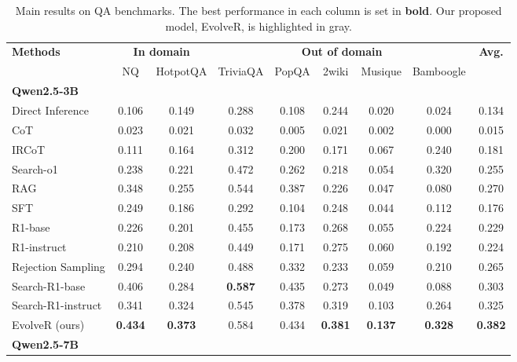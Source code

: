 \begin{table}[!t]
    \small
    \centering
    \setlength{\tabcolsep}{5pt}
    \caption{Main results on QA benchmarks. The best performance in each column is set in \textbf{bold}. Our proposed model, EvolveR, is highlighted in gray.}
    \label{tab:main_results}
    \begin{tabular}{l cc ccccc c} %
        \toprule
        \multirow{2}{*}{\textbf{Methods}}& \multicolumn{2}{c}{\textbf{In domain}} & \multicolumn{5}{c}{\textbf{Out of domain}} & \multirow{2}{*}{\textbf{Avg.}} \\
        \cmidrule(lr){2-3} \cmidrule(lr){4-8}
        & NQ & HotpotQA & TriviaQA & PopQA & 2wiki & Musique & Bamboogle & \\
        \midrule
        \multicolumn{9}{l}{\textbf{Qwen2.5-3B}} \\
        Direct Inference & 0.106 & 0.149 & 0.288 & 0.108 & 0.244 & 0.020 & 0.024 & 0.134 \\
        CoT & 0.023 & 0.021 & 0.032 & 0.005 & 0.021 & 0.002 & 0.000 & 0.015 \\
        IRCoT & 0.111 & 0.164 & 0.312 & 0.200 & 0.171 & 0.067 & 0.240 & 0.181 \\
        Search-o1 & 0.238 & 0.221 & 0.472 & 0.262 & 0.218 & 0.054 & 0.320 & 0.255 \\
        RAG & 0.348 & 0.255 & 0.544 & 0.387 & 0.226 & 0.047 & 0.080 & 0.270 \\
        SFT & 0.249 & 0.186 & 0.292 & 0.104 & 0.248 & 0.044 & 0.112 & 0.176 \\
        R1-base & 0.226 & 0.201 & 0.455 & 0.173 & 0.268 & 0.055 & 0.224 & 0.229 \\
        R1-instruct & 0.210 & 0.208 & 0.449 & 0.171 & 0.275 & 0.060 & 0.192 & 0.224 \\
        Rejection Sampling & 0.294 & 0.240 & 0.488 & 0.332 & 0.233 & 0.059 & 0.210 & 0.265 \\
        Search-R1-base & 0.406 & 0.284 & \textbf{0.587} & 0.435 & 0.273 & 0.049 & 0.088 & 0.303 \\
        Search-R1-instruct & 0.341 & 0.324 & 0.545 & 0.378 & 0.319 & 0.103 & 0.264 & 0.325 \\
        \rowcolor{Gray}
        EvolveR (ours) & \textbf{0.434} & \textbf{0.373} & 0.584 & 0.434 & \textbf{0.381} & \textbf{0.137} & \textbf{0.328} & \textbf{0.382} \\
        \midrule
        \multicolumn{9}{l}{\textbf{Qwen2.5-7B}} \\

\end{tabular}
\end{table}
